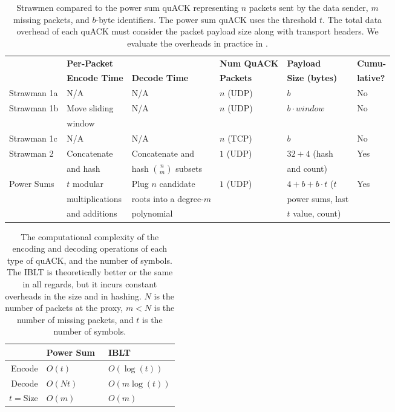 \begin{table*}[ht]
  \centering
  \small
  \begin{tabular}{llllll}
    \toprule
    & \bf Per-Packet & \bf & \bf Num QuACK & \bf Payload & \bf Cumu-\\
    & \bf Encode Time & \bf Decode Time & \bf Packets & \bf Size (bytes) & \bf lative?\\
    \midrule
    Strawman 1a & N/A & N/A & $n$ (UDP) & $b$ & No \\
    Strawman 1b & Move sliding & N/A & $n$ (UDP) & $b \cdot window$ & No \\
    & window  & & & & \\
    Strawman 1c & N/A & N/A & $n$ (TCP) & $b$ & No \\
    Strawman 2 & Concatenate & Concatenate and & $1$ (UDP) & $32+4$ (hash & Yes \\
    & and hash & hash $\binom{n}{m}$ subsets & & and count) & \\
    Power Sums & $t$ modular & Plug $n$ candidate & $1$ (UDP) & $4+b+b\cdot t$ ($t$ & Yes \\
    & multiplications & roots into a degree-$m$ & & power sums, last & \\
    & and additions & polynomial & & $t$ value, count) & \\
    \bottomrule
  \end{tabular}
  \caption{Strawmen compared to the power sum quACK representing $n$ packets
  sent by the data sender, $m$ missing packets, and $b$-byte identifiers. The
  power sum quACK uses the threshold $t$. The total data overhead of each
  quACK must consider the packet payload size along with transport headers.
  We evaluate the overheads in practice in .
  }
  \label{tab:quack:strawmen-theoretical}
\end{table*}
\begin{table}[t]
    \centering
    \begin{tabular}{r l l}
        \toprule
        \bf & Power Sum~\cite{yuan2024sidekick} & IBLT \\
        \midrule
        Encode & $O(t)$ & $O(\log(t))$ \\
        Decode & $O(Nt)$ & $O(m\log(t))$ \\
        $t=$Size & $O(m)$ & $O(m)$ \\
        \bottomrule
    \end{tabular}
    \caption{The computational complexity of the encoding and decoding
    operations of each type of quACK, and the number of symbols. The IBLT
    is theoretically better or the same in all regards, but it
    incurs constant overheads in the size and in hashing.
    $N$ is the number of packets at the proxy, $m < N$ is the number of
     missing packets, and $t$ is the number of symbols.}
    \label{tab:quack-complexity}
\end{table}
